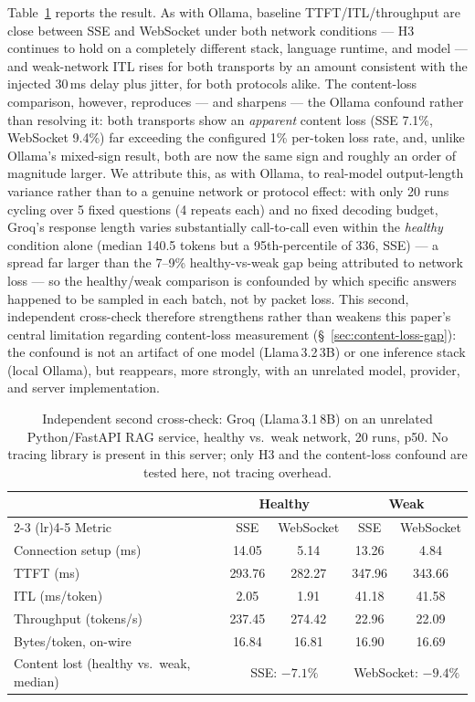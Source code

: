\documentclass[11pt]{article}
\begin{document}
Table~\ref{tab:groq} reports the result. As with Ollama, baseline TTFT/ITL/throughput are close between SSE and WebSocket under both network conditions --- H3 continues to hold on a completely different stack, language runtime, and model --- and weak-network ITL rises for both transports by an amount consistent with the injected 30\,ms delay plus jitter, for both protocols alike. The content-loss comparison, however, reproduces --- and sharpens --- the Ollama confound rather than resolving it: both transports show an \emph{apparent} content loss (SSE 7.1\%, WebSocket 9.4\%) far exceeding the configured 1\% per-token loss rate, and, unlike Ollama's mixed-sign result, both are now the same sign and roughly an order of magnitude larger. We attribute this, as with Ollama, to real-model output-length variance rather than to a genuine network or protocol effect: with only 20 runs cycling over 5 fixed questions (4 repeats each) and no fixed decoding budget, Groq's response length varies substantially call-to-call even within the \emph{healthy} condition alone (median 140.5 tokens but a 95th-percentile of 336, SSE) --- a spread far larger than the 7--9\% healthy-vs-weak gap being attributed to network loss --- so the healthy/weak comparison is confounded by which specific answers happened to be sampled in each batch, not by packet loss. This second, independent cross-check therefore strengthens rather than weakens this paper's central limitation regarding content-loss measurement (\S~\ref{sec:content-loss-gap}): the confound is not an artifact of one model (Llama\,3.2\,3B) or one inference stack (local Ollama), but reappears, more strongly, with an unrelated model, provider, and server implementation.

\begin{table}[H]
\centering\footnotesize
\caption{Independent second cross-check: Groq (Llama\,3.1\,8B) on an unrelated Python/FastAPI RAG service, healthy vs.\ weak network, 20 runs, p50. No tracing library is present in this server; only H3 and the content-loss confound are tested here, not tracing overhead.}
\label{tab:groq}
\begin{tabular}{@{}lcccc@{}}
\toprule
 & \multicolumn{2}{c}{Healthy} & \multicolumn{2}{c}{Weak} \\
\cmidrule(lr){2-3} \cmidrule(lr){4-5}
Metric & SSE & WebSocket & SSE & WebSocket \\
\midrule
Connection setup (ms) & 14.05 & 5.14 & 13.26 & 4.84 \\
TTFT (ms) & 293.76 & 282.27 & 347.96 & 343.66 \\
ITL (ms/token) & 2.05 & 1.91 & 41.18 & 41.58 \\
Throughput (tokens/s) & 237.45 & 274.42 & 22.96 & 22.09 \\
Bytes/token, on-wire & 16.84 & 16.81 & 16.90 & 16.69 \\
\midrule
Content lost (healthy vs.\ weak, median) & \multicolumn{2}{c}{SSE: $-7.1\%$} & \multicolumn{2}{c}{WebSocket: $-9.4\%$} \\
\bottomrule
\end{tabular}
\end{table}
\end{document}
